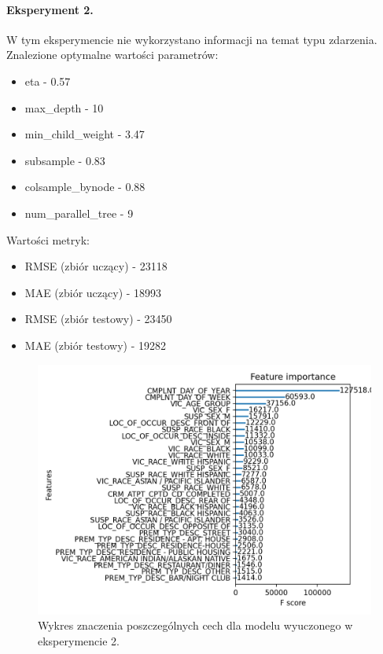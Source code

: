 \documentclass{classrep}
\begin{document}
{{{                \paragraph{Eksperyment 2.} W tym eksperymencie nie wykorzystano informacji na temat typu zdarzenia. Znalezione optymalne wartości parametrów:
                \begin{itemize}
                    \item eta - 0.57
                    \item max\_depth - 10
                    \item min\_child\_weight - 3.47
                    \item subsample - 0.83
                    \item colsample\_bynode - 0.88
                    \item num\_parallel\_tree - 9
                \end{itemize}
                Wartości metryk:
                \begin{itemize}
                    \item RMSE (zbiór uczący) - 23118
                    \item MAE (zbiór uczący) - 18993
                    \item RMSE (zbiór testowy) - 23450
                    \item MAE (zbiór testowy) - 19282
                \end{itemize}
                \begin{figure}[!htbp]
                    \centering
                    \includegraphics[width=\textwidth]{img/importance_2.png}
                    \caption{Wykres znaczenia poszczególnych cech dla modelu wyuczonego w eksperymencie 2.}
                    \label{importance_2}
                \end{figure}
                \FloatBarrier
            }

}}
\end{document}
